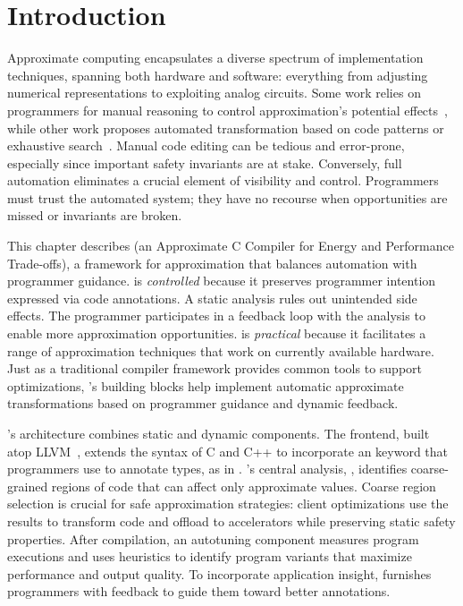 \section{Introduction}\label{accept:sec:intro}

Approximate computing encapsulates a diverse spectrum of
implementation techniques, spanning both hardware and software:
everything from adjusting numerical representations
to exploiting analog circuits.
Some work relies on programmers for manual reasoning to control
approximation's
potential effects~\cite{npu, flikker, races-ibm, perforation},
while other work proposes automated transformation based on code
patterns or exhaustive search~\cite{green, paraprox, sage}.
Manual code editing can be tedious and error-prone, especially since
important safety invariants are at stake.
Conversely, full automation eliminates a crucial element of
visibility and control.
Programmers must trust the automated system; they have no recourse when
opportunities are missed or invariants are broken.

This chapter describes \sysname
(an Approximate C Compiler for Energy and Performance Trade-offs),
a framework for approximation that balances automation with programmer
guidance.
\sysname is \emph{controlled} because it preserves programmer intention
expressed via code annotations.
A static analysis rules out
unintended side effects. The programmer participates in a feedback loop with
the analysis to enable more approximation
opportunities.
\sysname is \emph{practical} because it facilitates a range
of approximation techniques that work on currently available hardware.
Just as a traditional compiler framework provides common tools to support
optimizations,
\sysname's building blocks help implement automatic
approximate transformations based on programmer guidance and dynamic feedback.

\sysname's architecture combines static and dynamic components.
The frontend, built atop LLVM~\cite{llvm}, extends the syntax of C and C++ to
incorporate an  keyword that programmers use to annotate types, as
in .
\sysname's central analysis, \emph{\precisepurity}, identifies coarse-grained
regions of code that can
affect only approximate values.
Coarse region selection is crucial for safe approximation strategies:
client optimizations use the results to
transform code and offload to accelerators while preserving static safety
properties.
After compilation, an autotuning component measures program executions
and uses heuristics to identify program variants that maximize performance and output quality.
To incorporate application insight, \sysname furnishes programmers with feedback
to guide them toward better annotations.


